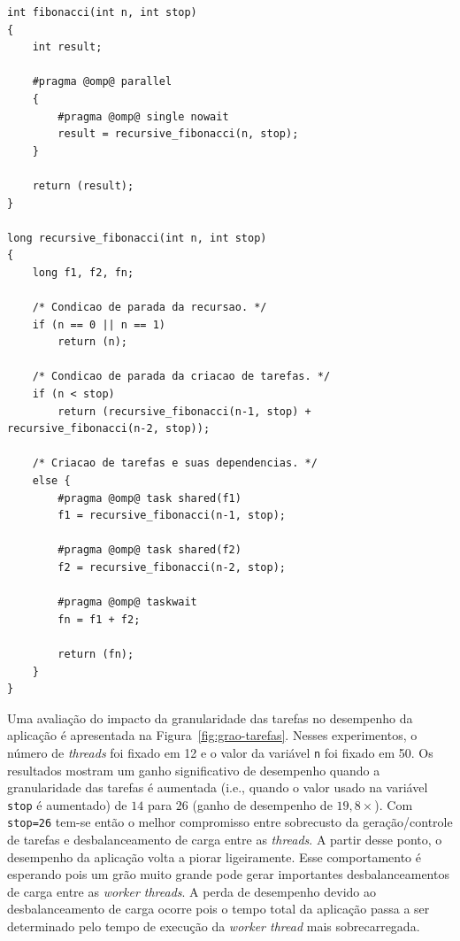 \documentclass{SBCbookchapter}
\begin{document}
\begin{lstlisting}[float,floatplacement=b,frame=single,
caption=Implementação recursiva da sequência de Fibonacci., label=listing:fibonacci]
int fibonacci(int n, int stop)
{
	int result;
	
	#pragma @omp@ parallel
  	{
		#pragma @omp@ single nowait
		result = recursive_fibonacci(n, stop);
	}
		
	return (result);
}

long recursive_fibonacci(int n, int stop)
{
	long f1, f2, fn;

	/* Condicao de parada da recursao. */
	if (n == 0 || n == 1) 
		return (n);

	/* Condicao de parada da criacao de tarefas. */
	if (n < stop) 
		return (recursive_fibonacci(n-1, stop) + recursive_fibonacci(n-2, stop));
	
	/* Criacao de tarefas e suas dependencias. */
	else {
		#pragma @omp@ task shared(f1)
		f1 = recursive_fibonacci(n-1, stop);

		#pragma @omp@ task shared(f2)
		f2 = recursive_fibonacci(n-2, stop);
		
		#pragma @omp@ taskwait
		fn = f1 + f2;
			
		return (fn);
	}
}
\end{lstlisting}

	Uma avaliação do impacto da granularidade das tarefas no desempenho
	da aplicação é apresentada na Figura~\ref{fig:grao-tarefas}. Nesses
	experimentos, o número de \textit{threads} foi fixado em 12 e o
	valor da variável \texttt{n} foi fixado em 50. Os resultados mostram um ganho
	significativo de desempenho quando a granularidade das tarefas é aumentada
	(i.e., quando o valor usado na variável \texttt{stop} é aumentado) de $14$ para $26$
	(ganho de desempenho de $19,8\times$).  Com \texttt{stop=26} tem-se então o
	melhor compromisso entre sobrecusto da geração/controle de tarefas e
	desbalanceamento de carga entre as \textit{threads}. A partir desse
	ponto, o desempenho da aplicação volta a piorar ligeiramente. Esse
	comportamento é esperando pois um grão muito grande pode gerar
	importantes desbalanceamentos de carga entre as \textit{worker threads}. A perda de
	desempenho devido ao desbalanceamento de carga ocorre pois o tempo total
	da aplicação passa a ser determinado pelo tempo de execução da \textit{worker thread}
	mais sobrecarregada.
\end{document}
